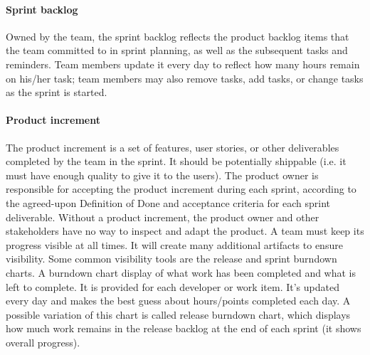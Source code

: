 \paragraph{Sprint backlog}
Owned by the team, the sprint backlog reflects the product backlog items that the team committed to in sprint planning, as well as the subsequent tasks and reminders.
Team members update it every day to reflect how many hours remain on his/her task; team members may also remove tasks, add tasks, or change tasks as the sprint is started.

\paragraph{Product increment}
The product increment is a set of features, user stories, or other deliverables completed by the team in the sprint.
It should be potentially shippable (i.e. it must have enough quality to give it to the users).
The product owner is responsible for accepting the product increment during each sprint, according to the agreed-upon Definition of Done and acceptance criteria for each sprint deliverable. Without a product increment, the product owner and other stakeholders have no way to inspect and adapt the product.
A team must keep its progress visible at all times. It will create many additional artifacts to ensure visibility.
Some common visibility tools are the release and sprint burndown charts.
A burndown chart display of what work has been completed and what is left to complete.
It is provided for each developer or work item. It's updated every day and makes the best guess about hours/points completed each day.
A possible variation of this chart is called release burndown chart, which displays how much work remains in the release backlog at the end of each sprint (it shows overall progress).
